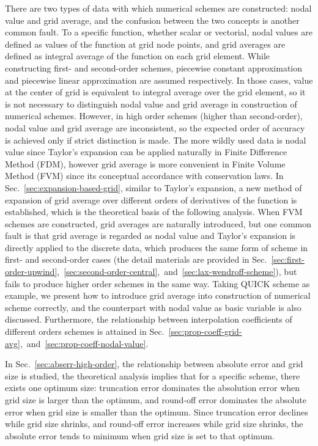 \documentclass[]{article}
\begin{document}
There are two types of data with which numerical schemes are constructed: nodal
value and grid average, and the confusion between the two concepts is another
common fault. To a specific function, whether scalar or vectorial,
nodal values are defined as values of the function at grid node points,
and grid averages are defined as integral average of the function on each
grid element.
While constructing first- and second-order schemes, piecewise constant
approximation and piecewise linear approximation are assumed respectively.
In those cases, value at the center of grid is equivalent to integral average 
over the grid element, so it is not necessary to distinguish nodal value and grid
average in construction of numerical schemes. However, in high order schemes
(higher than second-order), nodal value and grid average are inconsistent,
so the expected order of accuracy is achieved only if strict distinction is made.
The more wildly used data is nodal value since Taylor's
expansion can be applied naturally in Finite Difference Method (FDM), however
grid average is more convenient in Finite Volume Method (FVM) since its
conceptual accordance with conservation laws. 
In Sec.~\ref{sec:expansion-based-grid}, similar to Taylor's expansion, a new
method of expansion of grid average over different orders of derivatives of the
function is established, which is the theoretical basis of the following
analysis. 
When FVM schemes are constructed, grid averages are naturally introduced, but 
one common fault is that grid average is regarded as nodal value
and Taylor's expansion is directly applied to the discrete data, 
which produces the same form of scheme in first- and
second-order cases (the detail materials are provided in 
Sec.~\ref{sec:first-order-upwind},~\ref{sec:second-order-central},~and~\ref{sec:lax-wendroff-scheme}),
but fails to produce higher order
schemes in the same way. Taking QUICK scheme as example, we present how to
introduce grid average into
construction of numerical scheme correctly, and the counterpart with nodal value
as basic variable is also discussed.
Furthermore, the relationship between interpolation
coefficients of different orders schemes is attained in
Sec.~\ref{sec:prop-coeff-grid-avg},~and~\ref{sec:prop-coeff-nodal-value}.

In Sec.~\ref{sec:abserr-high-order}, the relationship between
absolute error and grid size is studied, the theoretical analysis
implies that for a specific scheme, there exists one optimum size:
truncation error dominates the absolution error when grid size is larger
than the optimum, and round-off error dominates the absolute error when
grid size is smaller than the optimum. Since truncation error declines while
grid size shrinks, and round-off error increases while grid size shrinks, the
absolute error tends to minimum when grid size is set to that optimum.
\end{document}
